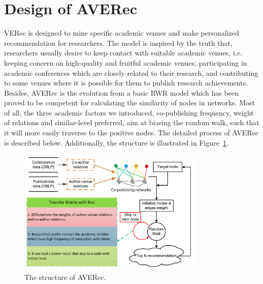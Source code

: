 \documentclass[9pt]{acm_proc_article-sp}
\begin{document}
\section{Design of AVERec}
VERec is designed to mine specific academic venues and make personalized recommendation for researchers. The model is inspired by the truth that, researchers usually desire to keep contact with suitable academic venues, i.e. keeping concern on high-quality and fruitful academic venues, participating in academic conferences which are closely related to their research, and contributing to some venues where it is possible for them to publish research achievements. Besides, AVERec is the evolution from a basic RWR model which has been proved to be competent for calculating the similarity of nodes in networks. Most of all, the three academic factors we introduced, co-publishing frequency, weight of relations and similar-level preferred, aim at biasing the random walk, such that it will more easily traverse to the positive nodes. The detailed process of AVERec is described below. Additionally, the structure is illustrated in Figure~\ref{Fig1}.
\begin{figure}[!ht]
\centering
\includegraphics [width=3.5in]{Fig1.pdf}
\caption{The structure of AVERec.}
\label{Fig1}
\end{figure}
\end{document}
